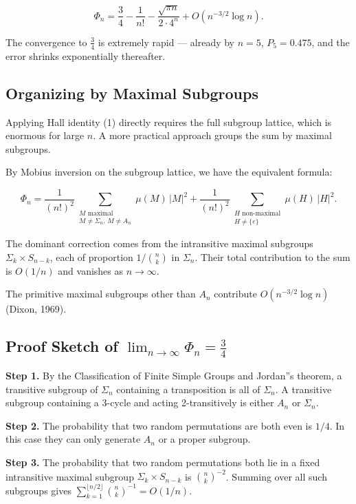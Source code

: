 \documentclass[12pt,a4paper]{article}
\begin{document}
\[Φ_n = \frac{3}{4} - \frac{1}{n!} - \frac{\sqrt{\pi n}}{2 \cdot 4^n} + O\left(n^{-3/2}\log n\right). \tag{3}\]

The convergence to $\tfrac{3}{4}$ is extremely rapid --- already by $n = 5$,
$P_5 = 0.475$, and the error shrinks exponentially thereafter.

\subsection{Organizing by Maximal Subgroups}

Applying Hall identity (1) directly requires the full subgroup lattice, which is
enormous for large $n$. A more practical approach groups the sum by maximal subgroups.

By Mobius inversion on the subgroup lattice, we have the equivalent formula:

\[Φ_n = \frac{1}{(n!)^2} \sum_{\substack{M \text{ maximal} \\ M \neq Σ_n,\, M \neq A_n}} \mu(M)\, |M|^2 + \frac{1}{(n!)^2} \sum_{\substack{H \text{ non-maximal} \\ H \neq \{e\}}} \mu(H)\, |H|^2.\]

The dominant correction comes from the intransitive maximal subgroups
$Σ_k \times S_{n-k}$, each of proportion $1/\binom{n}{k}$ in $Σ_n$. Their total
contribution to the sum is $O(1/n)$ and vanishes as $n \to \infty$.

The primitive maximal subgroups other than $A_n$ contribute $O(n^{-3/2}\log n)$
(Dixon, 1969).

\subsection{Proof Sketch of $\lim_{n \to \infty} Φ_n = \frac{3}{4}$}

\textbf{Step 1.} By the Classification of Finite Simple Groups and Jordan''s theorem, a
transitive subgroup of $Σ_n$ containing a transposition is all of $Σ_n$. A
transitive subgroup containing a 3-cycle and acting 2-transitively is either
$A_n$ or $Σ_n$.

\textbf{Step 2.} The probability that two random permutations are both even is $1/4$. In
this case they can only generate $A_n$ or a proper subgroup.

\textbf{Step 3.} The probability that two random permutations both lie in a fixed
intransitive maximal subgroup $Σ_k \times S_{n-k}$ is $\binom{n}{k}^{-2}$. Summing
over all such subgroups gives $\sum_{k=1}^{\lfloor n/2 \rfloor}\binom{n}{k}^{-1} = O(1/n)$.
\end{document}
